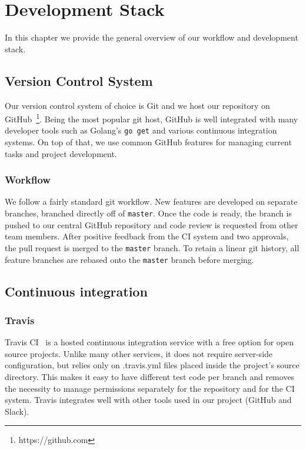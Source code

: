 \chapter{Development Stack}

In this chapter we provide the general overview of our workflow and
development stack.

\section{Version Control System}
Our version control system of choice is Git and we host our repository on
GitHub~\footnote{https://github.com}. Being the most popular git host,
GitHub is well integrated  with many developer tools such as Golang’s
\texttt{go get} and various continuous integration systems. On top of that,
we use common GitHub features for managing current tasks and project development.

\subsection{Workflow}
We follow a fairly standard git workflow. New features are developed on 
separate branches, branched directly off of \texttt{master}. Once the code
is ready, the branch is pushed to our central GitHub repository and code 
review is requested from other team members. After positive feedback from 
the CI system and two approvals, the pull request is merged to the 
\texttt{master} branch. To retain a linear git history, all feature branches 
are rebased onto the \texttt{master} branch before merging.

\section{Continuous integration}

\subsection{Travis}
Travis CI~\cite{travis} is a hosted continuous integration service with
a free option for open source projects.
Unlike many other services, it does not require server-side 
configuration, but relies only on .travis.yml files placed inside 
the project's source directory. This makes it easy to have different test 
code per branch and removes the necessity to manage permissions separately 
for the repository and for the CI system. Travis integrates well with other 
tools used in our project (GitHub and Slack).

